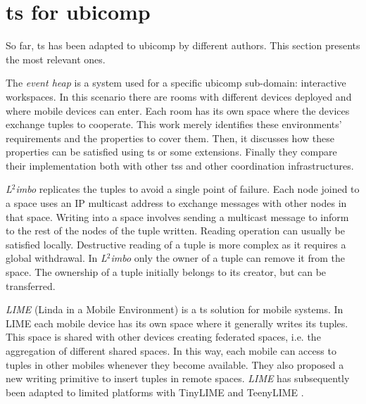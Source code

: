 \section{\acl{ts} for \ac{ubicomp}}
\label{sec:soa_ts_ubicomp}

So far, \acl{ts} has been adapted to \acl{ubicomp} by different authors.
This section presents the most relevant ones. %




The \emph{event heap} \citep{johanson_extending_2004} is a system used for a specific \ac{ubicomp} sub-domain: interactive workspaces.
In this scenario there are rooms with different devices deployed and where mobile devices can enter.
Each room has its own space where the devices exchange tuples to cooperate.
This work merely identifies these environments' requirements and the properties to cover them. %
Then, it discusses how these properties can be satisfied using \ac{ts} or some extensions.
Finally they compare their implementation both with other \acp{ts} and other coordination infrastructures. %


\emph{L$^2$imbo} \citep{davies_l2imbo:_1998,friday_experiences_1999} replicates the tuples to avoid a single point of failure.
Each node joined to a space uses an IP multicast address to exchange messages with other nodes in that space.
Writing into a space involves sending a multicast message to inform to the rest of the nodes of the tuple written.
Reading operation can usually be satisfied locally.
Destructive reading of a tuple is more complex as it requires a global withdrawal.
In \emph{L$^2$imbo} only the owner of a tuple can remove it from the space.
The ownership of a tuple initially belongs to its creator, but can be transferred. %


\emph{LIME} (Linda in a Mobile Environment) \citep{picco_lime:_1999} is a \ac{ts} solution for mobile systems.
In LIME each mobile device has its own space where it generally writes its tuples.
This space is shared with other devices creating federated spaces, i.e. the aggregation of different shared spaces.
In this way, each mobile can access to tuples in other mobiles whenever they become available.
They also proposed a new writing primitive to insert tuples in remote spaces.
\emph{LIME} has subsequently been adapted to limited platforms \citep{murphy_transiently_2006} with TinyLIME \citep{curino_tinylime:_2005} and TeenyLIME \citep{costa_programming_2007}.

